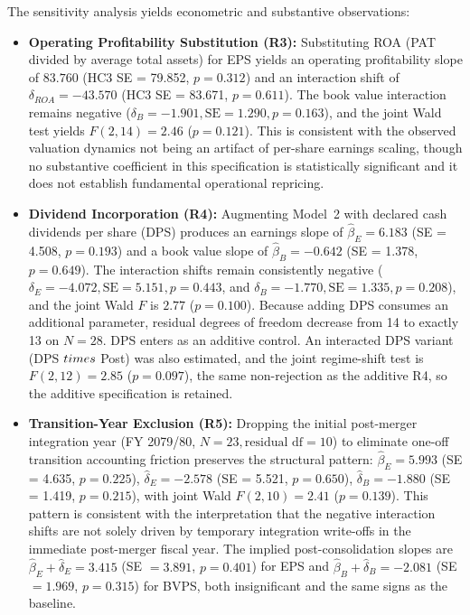The sensitivity analysis yields econometric and substantive observations:
\begin{itemize}
    \item \textbf{Operating Profitability Substitution (R3):} Substituting ROA (PAT divided by average total assets) for EPS yields an operating profitability slope of $83.760$ (HC3 SE = 79.852, $p = 0.312$) and an interaction shift of $\delta_{ROA} = -43.570$ (HC3 SE = 83.671, $p = 0.611$). The book value interaction remains negative ($\delta_B = -1.901, \text{SE} = 1.290, p = 0.163$), and the joint Wald test yields $F(2, 14) = 2.46$ ($p = 0.121$). This is consistent with the observed valuation dynamics not being an artifact of per-share earnings scaling, though no substantive coefficient in this specification is statistically significant and it does not establish fundamental operational repricing.
    \item \textbf{Dividend Incorporation (R4):} Augmenting Model~2 with declared cash dividends per share (DPS) produces an earnings slope of $\hat{\beta}_E = 6.183$ (SE = 4.508, $p = 0.193$) and a book value slope of $\hat{\beta}_B = -0.642$ (SE = 1.378, $p = 0.649$). The interaction shifts remain consistently negative ($\delta_E = -4.072, \text{SE} = 5.151, p = 0.443$, and $\delta_B = -1.770, \text{SE} = 1.335, p = 0.208$), and the joint Wald $F$ is $2.77$ ($p = 0.100$). Because adding DPS consumes an additional parameter, residual degrees of freedom decrease from 14 to exactly 13 on $N = 28$. DPS enters as an additive control. An interacted DPS variant (DPS $\\times$ Post) was also estimated, and the joint regime-shift test is $F(2,12)=2.85$ ($p=0.097$), the same non-rejection as the additive R4, so the additive specification is retained.
    \item \textbf{Transition-Year Exclusion (R5):} Dropping the initial post-merger integration year (FY 2079/80, $N = 23, \text{residual df} = 10$) to eliminate one-off transition accounting friction preserves the structural pattern: $\hat{\beta}_E = 5.993$ (SE = 4.635, $p = 0.225$), $\hat{\delta}_E = -2.578$ (SE = 5.521, $p = 0.650$), $\hat{\delta}_B = -1.880$ (SE = 1.419, $p = 0.215$), with joint Wald $F(2, 10) = 2.41$ ($p = 0.139$). This pattern is consistent with the interpretation that the negative interaction shifts are not solely driven by temporary integration write-offs in the immediate post-merger fiscal year. The implied post-consolidation slopes are $\hat{\beta}_E + \hat{\delta}_E = 3.415$ (SE $= 3.891$, $p = 0.401$) for EPS and $\hat{\beta}_B + \hat{\delta}_B = -2.081$ (SE $= 1.969$, $p = 0.315$) for BVPS, both insignificant and the same signs as the baseline.

\end{itemize}
